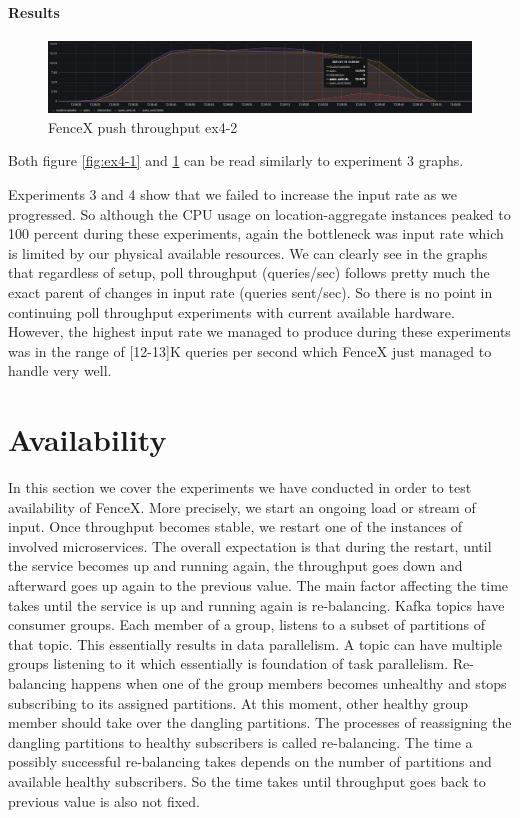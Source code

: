 \documentclass[a4]{report}
\begin{document}
    \paragraph{Results}
    \begin{figure}[ht]
        \caption{FenceX push throughput ex4-2}
        \label{fig:ex4-2}
        \includegraphics[scale=0.4]{images/evaluation/ex4-benchmarking(22,10).png}
    \end{figure}

    Both figure \ref{fig:ex4-1} and \ref{fig:ex4-2} can be read similarly to experiment 3 graphs.

    Experiments 3 and 4 show that we failed to increase the input rate as we progressed.
    So although the CPU usage on location-aggregate instances peaked to 100 percent during these experiments,
    again the bottleneck was input rate which is limited by our physical available resources.
    We can clearly see in the graphs that regardless of setup, poll throughput (queries/sec) follows pretty
    much the exact parent of changes in input rate (queries sent/sec).
    So there is no point in continuing poll throughput experiments with current available hardware.
    However, the highest input rate we managed to produce during these experiments was in the range of [12-13]K queries
    per second which FenceX just managed to handle very well.


    \section{Availability}
    In this section we cover the experiments we have conducted in order to test availability of FenceX.
    More precisely, we start an ongoing load or stream of input.
    Once throughput becomes stable, we restart one of the instances of involved microservices.
    The overall expectation is that during the restart, until the service becomes up and running again, the throughput
    goes down and afterward goes up again to the previous value.
    The main factor affecting the time takes until the service is up and running again is re-balancing.
    Kafka topics have consumer groups.
    Each member of a group, listens to a subset of partitions of that topic.
    This essentially results in data parallelism.
    A topic can have multiple groups listening to it which essentially is foundation of task parallelism.
    Re-balancing happens when one of the group members becomes unhealthy and stops subscribing to its assigned
    partitions.
    At this moment, other healthy group member should take over the dangling partitions.
    The processes of reassigning the dangling partitions to healthy subscribers is called re-balancing.
    The time a possibly successful re-balancing takes depends on the number of partitions and available
    healthy subscribers.
    So the time takes until throughput goes back to previous value is also not fixed.
\end{document}
